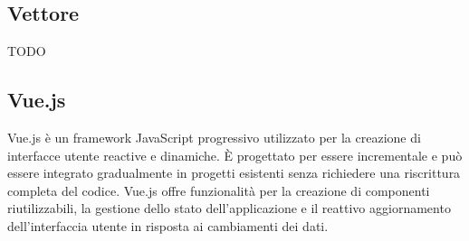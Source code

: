 \vspace{2em}
\subsection*{Vettore}
TODO

\vspace{2em}
\subsection*{Vue.js}
Vue.js è un framework JavaScript progressivo utilizzato per la creazione di interfacce utente reactive e dinamiche. È progettato per essere incrementale e può essere integrato gradualmente in progetti esistenti senza richiedere una riscrittura completa del codice. Vue.js offre funzionalità per la creazione di componenti riutilizzabili, la gestione dello stato dell'applicazione e il reattivo aggiornamento dell'interfaccia utente in risposta ai cambiamenti dei dati.

